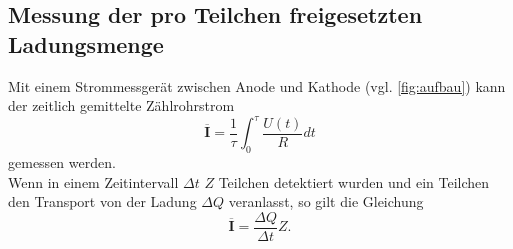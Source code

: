 \subsection{Messung der pro Teilchen freigesetzten Ladungsmenge}
\label{sec:theo:messung-freigesetzte-ladungsmenge}

Mit einem Strommessgerät zwischen Anode und Kathode (vgl. \autoref{fig:aufbau}) kann der zeitlich gemittelte
Zählrohrstrom
\begin{equation}
	\overline{\mathbf{I}} = \frac 1 \tau \int_0^\tau \frac{U(t)}{R} dt
	\label{eqn:theo:mittlerer-zaehlrohrstrom}
\end{equation}
gemessen werden.
\\
Wenn in einem Zeitintervall $\Delta t$ $Z$ Teilchen detektiert wurden und ein Teilchen den Transport von der Ladung
$\Delta Q$ veranlasst, so gilt die Gleichung
\begin{equation}
	\overline{\mathbf{I}} = \frac{\Delta Q}{\Delta t} Z.
\end{equation}
